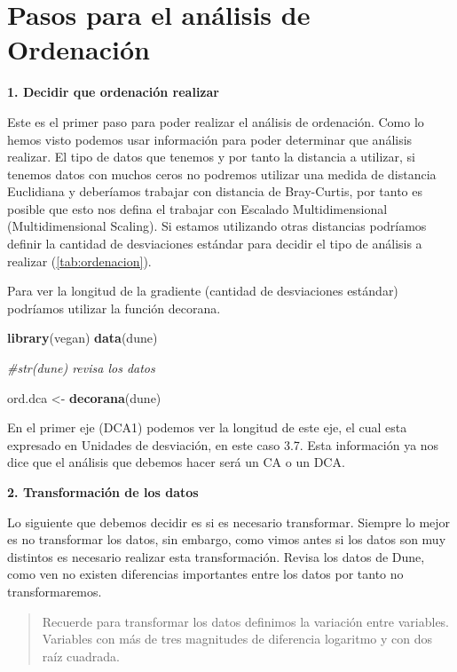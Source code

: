 \documentclass[]{book}
\newenvironment{Shaded}{\begin{snugshade}}{\end{snugshade}}
\newcommand{\KeywordTok}[1]{\textcolor[rgb]{0.13,0.29,0.53}{\textbf{{#1}}}}
\newcommand{\StringTok}[1]{\textcolor[rgb]{0.31,0.60,0.02}{{#1}}}
\newcommand{\CommentTok}[1]{\textcolor[rgb]{0.56,0.35,0.01}{\textit{{#1}}}}
\newcommand{\NormalTok}[1]{{#1}}
\begin{document}
\section{Pasos para el análisis de
Ordenación}\label{pasos-para-el-analisis-de-ordenacion}

\textbf{1. Decidir que ordenación realizar}

Este es el primer paso para poder realizar el análisis de ordenación.
Como lo hemos visto podemos usar información para poder determinar que
análisis realizar. El tipo de datos que tenemos y por tanto la distancia
a utilizar, si tenemos datos con muchos ceros no podremos utilizar una
medida de distancia Euclidiana y deberíamos trabajar con distancia de
Bray-Curtis, por tanto es posible que esto nos defina el trabajar con
Escalado Multidimensional (Multidimensional Scaling). Si estamos
utilizando otras distancias podríamos definir la cantidad de
desviaciones estándar para decidir el tipo de análisis a realizar
(\ref{tab:ordenacion}).

Para ver la longitud de la gradiente (cantidad de desviaciones estándar)
podríamos utilizar la función decorana.

\begin{Shaded}
\begin{Highlighting}[]
\KeywordTok{library}\NormalTok{(vegan)}
\KeywordTok{data}\NormalTok{(dune)}

\CommentTok{#str(dune) revisa los datos}

\NormalTok{ord.dca <-}\StringTok{ }\KeywordTok{decorana}\NormalTok{(dune)}
\end{Highlighting}
\end{Shaded}

En el primer eje (DCA1) podemos ver la longitud de este eje, el cual
esta expresado en Unidades de desviación, en este caso 3.7. Esta
información ya nos dice que el análisis que debemos hacer será un CA o
un DCA.

\textbf{2. Transformación de los datos}

Lo siguiente que debemos decidir es si es necesario transformar. Siempre
lo mejor es no transformar los datos, sin embargo, como vimos antes si
los datos son muy distintos es necesario realizar esta transformación.
Revisa los datos de Dune, como ven no existen diferencias importantes
entre los datos por tanto no transformaremos.

\begin{quote}
Recuerde para transformar los datos definimos la variación entre
variables. Variables con más de tres magnitudes de diferencia logaritmo
y con dos raíz cuadrada.
\end{quote}
\end{document}
